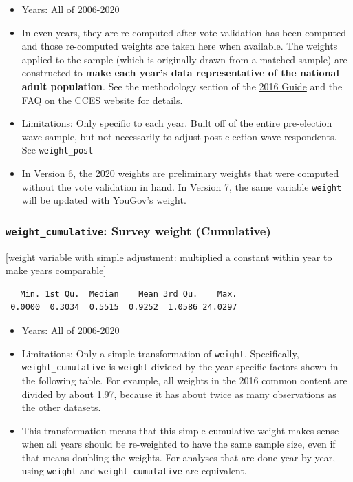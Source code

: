 \documentclass[10pt,article,oneside]{memoir}
\theoremstyle{definition}
\begin{document}
\begin{itemize}
\tightlist
\item
  Years: All of 2006-2020
\item
  In even years, they are re-computed after vote validation has been
  computed and those re-computed weights are taken here when available.
  The weights applied to the sample (which is originally drawn from a
  matched sample) are constructed to \textbf{make each year's data
  representative of the national adult population}. See the methodology
  section of the
  \href{https://dataverse.harvard.edu/api/access/datafile/3047286}{2016
  Guide} and the
  \href{https://cces.gov.harvard.edu/frequently-asked-questions}{FAQ on
  the CCES website} for details.
\item
  Limitations: Only specific to each year. Built off of the entire
  pre-election wave sample, but not necessarily to adjust post-election
  wave respondents. See \texttt{weight\_post}
\item
  In Version 6, the 2020 weights are preliminary weights that were
  computed without the vote validation in hand. In Version 7, the same
  variable \texttt{weight} will be updated with YouGov's weight.
\end{itemize}

\hypertarget{weight_cumulative-survey-weight-cumulative}{%
\subsubsection{\texorpdfstring{\texttt{weight\_cumulative}: Survey
weight
(Cumulative)}{weight\_cumulative: Survey weight (Cumulative)}}\label{weight_cumulative-survey-weight-cumulative}}

{[}weight variable with simple adjustment: multiplied a constant within
year to make years comparable{]}

\begin{verbatim}
   Min. 1st Qu.  Median    Mean 3rd Qu.    Max. 
 0.0000  0.3034  0.5515  0.9252  1.0586 24.0297 
\end{verbatim}

\begin{itemize}
\tightlist
\item
  Years: All of 2006-2020
\item
  Limitations: Only a simple transformation of \texttt{weight}.
  Specifically, \texttt{weight\_cumulative} is \texttt{weight} divided
  by the year-specific factors shown in the following table. For
  example, all weights in the 2016 common content are divided by about
  1.97, because it has about twice as many observations as the other
  datasets.
\item
  This transformation means that this simple cumulative weight makes
  sense when all years should be re-weighted to have the same sample
  size, even if that means doubling the weights. For analyses that are
  done year by year, using \texttt{weight} and
  \texttt{weight\_cumulative} are equivalent.
\end{itemize}
\end{document}
